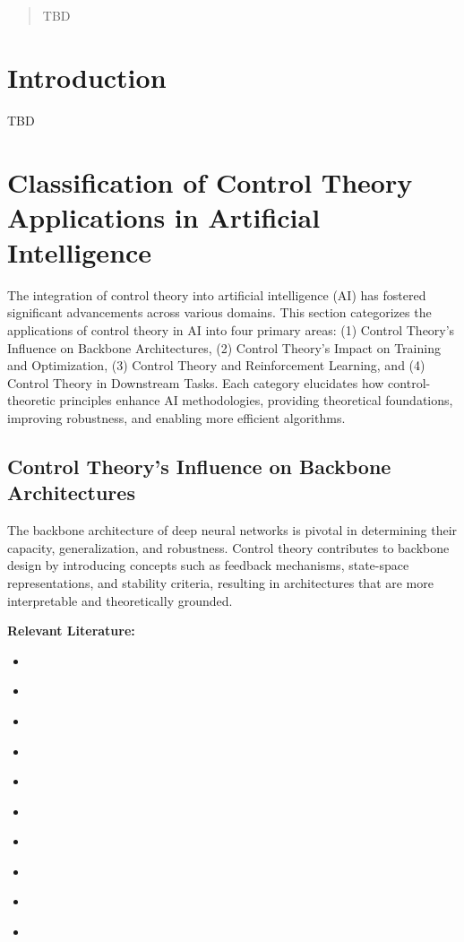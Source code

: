 \documentclass{article}
\theoremstyle{plain}
\theoremstyle{definition}
\theoremstyle{remark}
\begin{document}
\begin{abstract}
TBD
\end{abstract}

\section{Introduction}
TBD

\section{Classification of Control Theory Applications in Artificial Intelligence}

The integration of control theory into artificial intelligence (AI) has fostered significant advancements across various domains. This section categorizes the applications of control theory in AI into four primary areas: (1) Control Theory's Influence on Backbone Architectures, (2) Control Theory's Impact on Training and Optimization, (3) Control Theory and Reinforcement Learning, and (4) Control Theory in Downstream Tasks. Each category elucidates how control-theoretic principles enhance AI methodologies, providing theoretical foundations, improving robustness, and enabling more efficient algorithms.

\subsection{Control Theory's Influence on Backbone Architectures}

The backbone architecture of deep neural networks is pivotal in determining their capacity, generalization, and robustness. Control theory contributes to backbone design by introducing concepts such as feedback mechanisms, state-space representations, and stability criteria, resulting in architectures that are more interpretable and theoretically grounded.

\textbf{Relevant Literature:}
\begin{itemize}
    \item \cite{heDeepResidualLearning2015}
    \item \cite{guMambaLineartimeSequence}
    \item \cite{daoTransformersAreSSMs2024}
    \item \cite{dongHambaSingleview3D2024}
    \item \cite{wangStateSpaceModel2024}
    \item \cite{abellaAsymptoticBehaviorAttention2024}
    \item \cite{tiezziStatespaceModelingLong2024}
    \item \cite{liDeepNeuralNetwork2022}
    \item \cite{liDeepLearningDynamical2022}
    \item \cite{zhangParameterefficientFinetuningControls}
\end{itemize}
\end{document}
